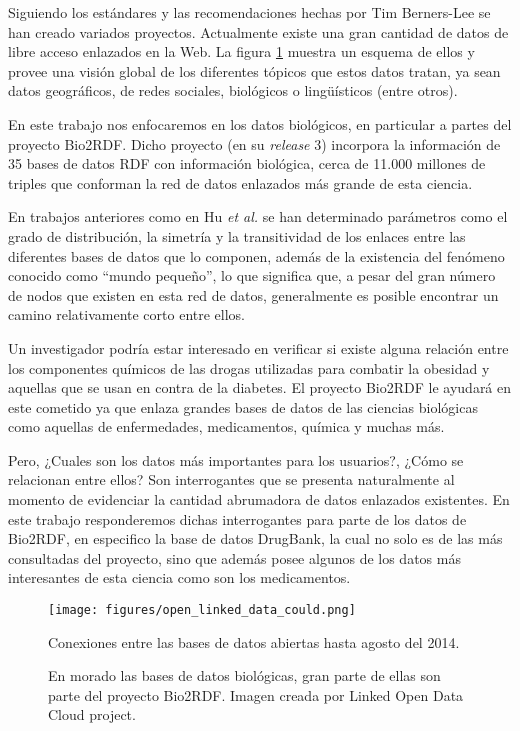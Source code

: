 Siguiendo los estándares y las recomendaciones hechas por Tim Berners-Lee se han
creado variados proyectos.
Actualmente existe una gran cantidad de datos de libre acceso enlazados en la
Web. La figura \ref{fig:cloud} muestra un esquema de ellos y provee una visión
global de los diferentes tópicos que estos datos tratan, ya sean datos
geográficos, de redes sociales, biológicos o lingüísticos (entre otros).

En este trabajo nos enfocaremos en los datos biológicos, en particular a partes
del proyecto Bio2RDF.
Dicho proyecto (en su \emph{release} 3) incorpora la información de 35 bases de
datos RDF con información biológica, cerca de 11.000 millones de triples que
conforman la red de datos enlazados más grande de esta ciencia.

En trabajos anteriores como en Hu \emph{et al.}\cite{hu2015link} se han
determinado parámetros como el grado de distribución, la simetría y la
transitividad de los enlaces entre las diferentes bases de datos que lo
componen, además de la existencia del fenómeno conocido como ``mundo pequeño'',
lo que significa que, a pesar del gran número de nodos que existen en esta red
de datos, generalmente es posible encontrar un camino relativamente corto entre
ellos.

Un investigador podría estar interesado en verificar si existe alguna relación
entre los componentes químicos de las drogas utilizadas para combatir la
obesidad y aquellas que se usan en contra de la diabetes.
El proyecto Bio2RDF le ayudará en este cometido ya que enlaza grandes bases de
datos de las ciencias biológicas como aquellas de enfermedades, medicamentos,
química y muchas más.

Pero, ¿Cuales son los datos más importantes para los usuarios?, ¿Cómo se
relacionan entre ellos? Son interrogantes que se presenta naturalmente al
momento de evidenciar la cantidad abrumadora de datos enlazados existentes.
En este trabajo responderemos dichas interrogantes para parte de los datos de
Bio2RDF, en especifico la base de datos DrugBank, la cual no solo es de las más
consultadas del proyecto, sino que además posee algunos de los datos más
interesantes de esta ciencia como son los medicamentos.

\begin{figure}[ht]
  \centering
  \texttt{[image: figures/open\_linked\_data\_could.png]}
  \caption{Conexiones entre las bases de datos abiertas hasta agosto del 2014.}
  \vspace{-.2cm}
  \caption*{\small
    En morado las bases de datos biológicas, gran parte de ellas son parte del
    proyecto Bio2RDF.
    Imagen creada por Linked Open Data Cloud project\cite{lod:cloud}.}
  \label{fig:cloud}
\end{figure}
~\vspace{-1cm}

